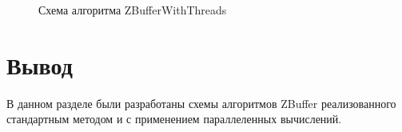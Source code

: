 \begin{figure}
	\caption{Схема алгоритма ZBufferWithThreads}
	\label{ZBufferWithThreads}
\end{figure}

\section{Вывод}
В данном разделе были разработаны схемы алгоритмов ZBuffer реализованного стандартным методом и с применением параллеленных вычислений.
